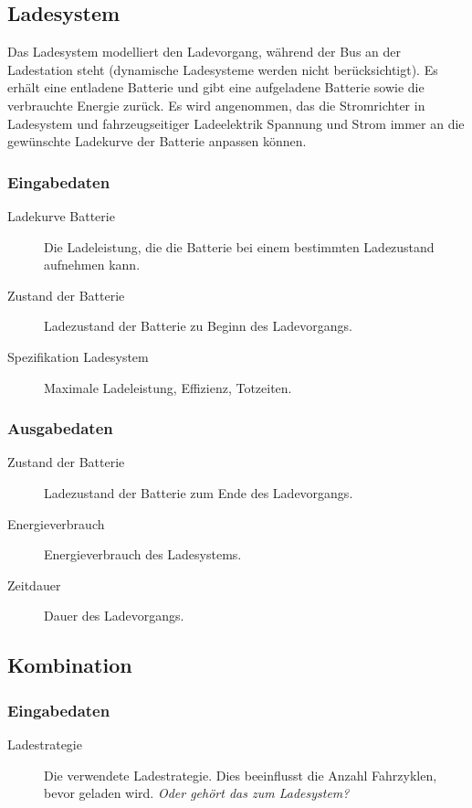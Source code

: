 \subsection{Ladesystem}
Das Ladesystem modelliert den Ladevorgang, während der Bus an der Ladestation steht (dynamische Ladesysteme werden nicht berücksichtigt). Es erhält eine entladene Batterie und gibt eine aufgeladene Batterie sowie die verbrauchte Energie zurück.
Es wird angenommen, das die Stromrichter in Ladesystem und fahrzeugseitiger Ladeelektrik Spannung und Strom immer an die gewünschte Ladekurve der Batterie anpassen können.

\subsubsection{Eingabedaten}
\begin{description}
	\item[Ladekurve Batterie] Die Ladeleistung, die die Batterie bei einem bestimmten Ladezustand aufnehmen kann.
	\item[Zustand der Batterie] Ladezustand der Batterie zu Beginn des Ladevorgangs.
	\item[Spezifikation Ladesystem] Maximale Ladeleistung, Effizienz, Totzeiten.
\end{description}

\subsubsection{Ausgabedaten}
\begin{description}
	\item[Zustand der Batterie] Ladezustand der Batterie zum Ende des Ladevorgangs.
	\item[Energieverbrauch] Energieverbrauch des Ladesystems.
	\item[Zeitdauer] Dauer des Ladevorgangs.
\end{description}

\subsection{Kombination}

\subsubsection{Eingabedaten}
\begin{description}
	\item[Ladestrategie] Die verwendete Ladestrategie. Dies beeinflusst die Anzahl Fahrzyklen, bevor geladen wird. \emph{Oder gehört das zum Ladesystem?}
\end{description}


